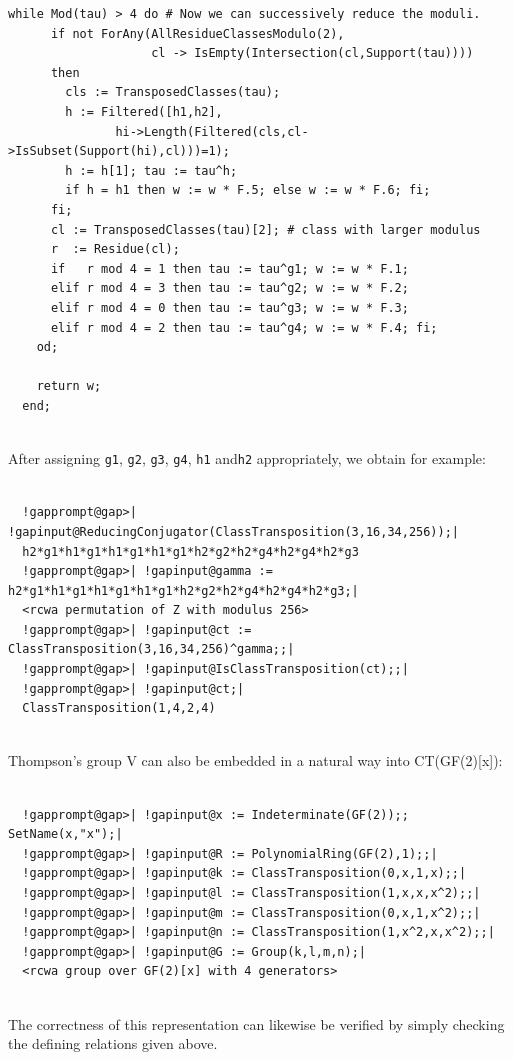 \documentclass[a4paper,11pt]{report}
\begin{document}
{{\begin{Verbatim}[commandchars=!@|,fontsize=\small,frame=single,label=GAP code]
    while Mod(tau) > 4 do # Now we can successively reduce the moduli.
      if not ForAny(AllResidueClassesModulo(2),
                    cl -> IsEmpty(Intersection(cl,Support(tau))))
      then
        cls := TransposedClasses(tau);
        h := Filtered([h1,h2],
               hi->Length(Filtered(cls,cl->IsSubset(Support(hi),cl)))=1);
        h := h[1]; tau := tau^h;
        if h = h1 then w := w * F.5; else w := w * F.6; fi;
      fi;
      cl := TransposedClasses(tau)[2]; # class with larger modulus
      r  := Residue(cl);
      if   r mod 4 = 1 then tau := tau^g1; w := w * F.1;
      elif r mod 4 = 3 then tau := tau^g2; w := w * F.2;
      elif r mod 4 = 0 then tau := tau^g3; w := w * F.3;
      elif r mod 4 = 2 then tau := tau^g4; w := w * F.4; fi;
    od;
  
    return w;
  end;
  
\end{Verbatim}
 After assigning \texttt{g1}, \texttt{g2}, \texttt{g3}, \texttt{g4}, \texttt{h1} and{\nobreakspace}\texttt{h2} appropriately, we obtain for example: 
\begin{Verbatim}[commandchars=!@|,fontsize=\small,frame=single,label=Example]
  
  !gapprompt@gap>| !gapinput@ReducingConjugator(ClassTransposition(3,16,34,256));|
  h2*g1*h1*g1*h1*g1*h1*g1*h2*g2*h2*g4*h2*g4*h2*g3
  !gapprompt@gap>| !gapinput@gamma := h2*g1*h1*g1*h1*g1*h1*g1*h2*g2*h2*g4*h2*g4*h2*g3;|
  <rcwa permutation of Z with modulus 256>
  !gapprompt@gap>| !gapinput@ct := ClassTransposition(3,16,34,256)^gamma;;|
  !gapprompt@gap>| !gapinput@IsClassTransposition(ct);;|
  !gapprompt@gap>| !gapinput@ct;|
  ClassTransposition(1,4,2,4)
  
\end{Verbatim}
 Thompson's group V can also be embedded in a natural way into CT(GF(2)[x]): 
\begin{Verbatim}[commandchars=!@|,fontsize=\small,frame=single,label=Example]
  
  !gapprompt@gap>| !gapinput@x := Indeterminate(GF(2));; SetName(x,"x");|
  !gapprompt@gap>| !gapinput@R := PolynomialRing(GF(2),1);;|
  !gapprompt@gap>| !gapinput@k := ClassTransposition(0,x,1,x);;|
  !gapprompt@gap>| !gapinput@l := ClassTransposition(1,x,x,x^2);;|
  !gapprompt@gap>| !gapinput@m := ClassTransposition(0,x,1,x^2);;|
  !gapprompt@gap>| !gapinput@n := ClassTransposition(1,x^2,x,x^2);;|
  !gapprompt@gap>| !gapinput@G := Group(k,l,m,n);|
  <rcwa group over GF(2)[x] with 4 generators>
  
\end{Verbatim}
 The correctness of this representation can likewise be verified by simply
checking the defining relations given above. 

}}
\end{document}
